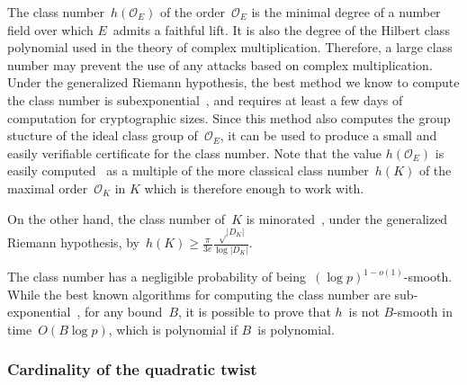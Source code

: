\documentclass[twocolumn,letterpaper,10pt]{article}
\let\ro\mathcal
\def\abs#1{\left|#1\right|}
\def\pa#1{\left(#1\right)}
\DeclareMathOperator\Cl{Cl}
\begin{document}
The class number~$h(\ro O_E)$ of the order~$\ro O_E$
is the minimal degree of a number field
over which $E$~admits a faithful lift.
It is also the degree of the Hilbert class polynomial
used in the theory of complex multiplication.
Therefore, a large class number may prevent the use
of any attacks based on complex multiplication.
Under the generalized Riemann hypothesis,
the best method we know to compute the class number
is subexponential~\cite{ams1989hmc,chile2009biasse},
and requires at least a few days of computation for cryptographic sizes.
Since this method also computes the group stucture
of the ideal class group of~$\ro O_E$,
it can be used to produce a small and easily verifiable certificate
for the class number.
Note that the value $h(\ro O_E)$ is easily computed~\cite[7.24]{cox1989primes}
as a multiple of the more classical class number~$h(K)$
of the maximal order~$\ro O_K$ in $K$
which is therefore enough to work with.

On the other hand,
the class number of~$K$ is minorated~\cite{cras1990louboutin},
under the generalized Riemann hypothesis,
by~$h(K) ≥ \frac{π}{3e} \frac{√{\abs{D_K}}}{\log \abs{D_K}}$.

\medbreak

The class number has a negligible probability
of being~$(\log p)^{1-o(1)}$-smooth.
While the best known algorithms for computing the class number
are sub-exponential~\cite{ams1989hmc,chile2009biasse},
for any bound~$B$,
it is possible to prove that $h$~is not $B$-smooth
in time~$O(B \log p)$,
which is polynomial if $B$~is polynomial.


\subsubsection{Cardinality of the quadratic twist}
\label{sss:normal-twist}
\end{document}
